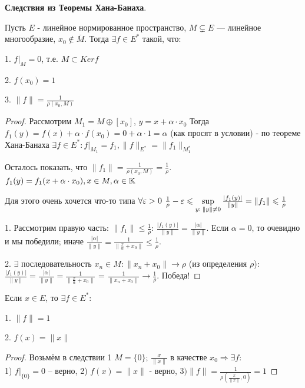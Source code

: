 \noindent\textbf{Следствия из Теоремы Хана-Банаха}.

\begin{corollary} Пусть $E$ - линейное нормированное пространство, $M \subsetneq E$ --- линейное многообразие, $x_0 \notin \overline{M} $. Тогда $\exists f \in E^*$ такой, что:

1. $f |_M = 0$, т.е. $M \subset Ker f$

2. $f(x_0) = 1$

3. $\|f\| = \frac{1}{\rho(x_0, M)}$
\end{corollary}

\begin{proof} Рассмотрим $M_1 = M \oplus [x_0]$, $y = x + \alpha \cdot x_0$
Тогда $f_1(y) = f(x) + \alpha \cdot f(x_0) = 0 + \alpha \cdot 1 = \alpha$ (как просят в условии) - по теореме Хана-Банаха $\exists f \in E^*: f|_{M_1} = f_1, \|f\|_{E^*} = \|f_1\|_{M_1^*}$

Осталось показать, что $\|f_1\| = \frac{1}{\rho(x_0, M)} = \frac 1 \rho$. $f_1(y) = f_1(x + \alpha \cdot x_0), x \in M, \alpha \in \mathbb{K}$

Для этого очень хочется что-то типа $\forall \varepsilon > 0$ $\frac{1}{\rho} - \varepsilon \leqslant \sup\limits_{y:\:\|y\| \neq 0} \frac{|f_1(y)|}{\|y\|} = \|f_1\| \leqslant \frac{1}{\rho}$

1. Рассмотрим правую часть: $\|f_1\| \leqslant \frac{1}{\rho}$: $\frac{|f_1(y)|}{\|y\|} = \frac{|\alpha|}{\|y\|}$. Если $\alpha = 0$, то очевидно и мы победили; иначе $\frac{|\alpha|}{\|y\|} = \frac{1}{\|\frac{x}{\alpha} + x_0\|} \leqslant \frac{1}{\rho}$. 

2. $\exists$ последовательность $x_n \in M: \|x_n + x_0 \| \to \rho$ (из определения $\rho$): $\frac{|f_1(y)|}{\|y\|} = \frac{|\alpha|}{\|y\|}  = \frac{1}{\|\frac{x}{\alpha} + x_0\|}$ = $\frac{1}{\|x_n + x_0\|} \to \frac{1}{\rho}$. Победа!


\end{proof}

\begin{corollary} Если $x \in E$, то $\exists f \in E^*$:

1. $\|f\| = 1$

2. $f(x) = \|x\|$
\end{corollary}
\begin{proof}
Возьмём в следствии 1 $M = \{0\}$; $\frac{x}{\|x\|}$ в качестве $x_0 \Rightarrow \exists f:$ \\ 1) $ f|_{\{0\}} = 0$ -- верно, 2) $ f(x) = \|x\|$ - верно, $3) \|f\| = \frac{1}{\rho \left(\frac{x}{\|x\|}, 0 \right)} = 1$
\end{proof}

